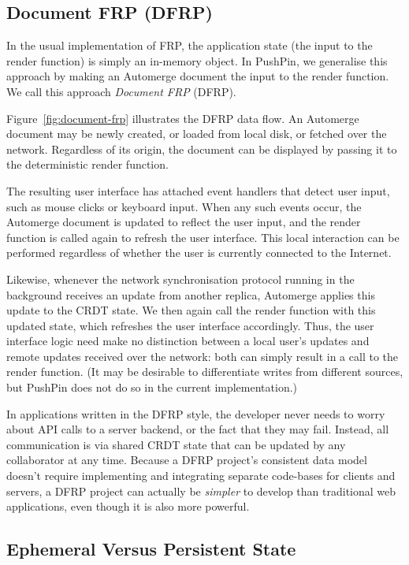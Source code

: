 \documentclass[sigplan,10pt]{acmart}
\begin{document}
\subsection{Document FRP (DFRP)}

In the usual implementation of FRP, the application state (the input to the render function) is simply an in-memory object.
In PushPin, we generalise this approach by making an Automerge document the input to the render function.
We call this approach \emph{Document FRP} (DFRP).

Figure~\ref{fig:document-frp} illustrates the DFRP data flow.
An Automerge document may be newly created, or loaded from local disk, or fetched over the network.
Regardless of its origin, the document can be displayed by passing it to the deterministic render function.

The resulting user interface has attached event handlers that detect user input, such as mouse clicks or keyboard input.
When any such events occur, the Automerge document is updated to reflect the user input, and the render function is called again to refresh the user interface.
This local interaction can be performed regardless of whether the user is currently connected to the Internet.

Likewise, whenever the network synchronisation protocol running in the background receives an update from another replica, Automerge applies this update to the CRDT state.
We then again call the render function with this updated state, which refreshes the user interface accordingly. Thus, the user interface logic need make no distinction between a local user's updates and remote updates received over the network: both can simply result in a call to the render function. (It may be desirable to differentiate writes from different sources, but PushPin does not do so in the current implementation.)

In applications written in the DFRP style, the developer never needs to worry about API calls to a server backend, or the fact that they may fail. Instead, all communication is via shared CRDT state that can be updated by any collaborator at any time. Because a DFRP project's consistent data model doesn't require implementing and integrating separate code-bases for clients and servers, a DFRP project can actually be \emph{simpler} to develop than traditional web applications, even though it is also more powerful.

\subsection{Ephemeral Versus Persistent State}
\end{document}
